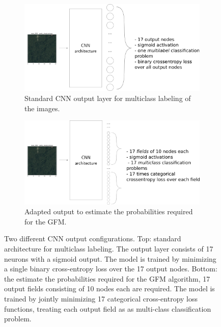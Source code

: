 \documentclass[fleqn]{homework}
\begin{document}
\begin{figure}
\centering
   \begin{subfigure}{0.80\linewidth}
      \centering
      \includegraphics[width=1\linewidth]{figures/GFM1.png}
      \caption{Standard CNN output layer for multiclass labeling of the images.}
   \end{subfigure}
   \begin{subfigure}{0.80\linewidth}
      \centering
      \includegraphics[width=1\linewidth]{figures/GFM2.png}
      \caption{Adapted output to estimate the probabilities required for the GFM.}
   \end{subfigure}
  \caption{Two different CNN output configurations. Top: standard architecture for multiclass labeling. The output layer consists of 17 neurons with a sigmoid output. The model is trained by minimizing a single binary cross-entropy loss over the 17 output nodes. Bottom: the estimate the probabilities required for the GFM algorithm, 17 output fields consisting of 10 nodes each are required. The model is trained by jointly minimizing 17 categorical cross-entropy loss functions, treating each output field as as multi-class classification problem.}
	\label{GFMarchi} 
\end{figure}
\end{document}
